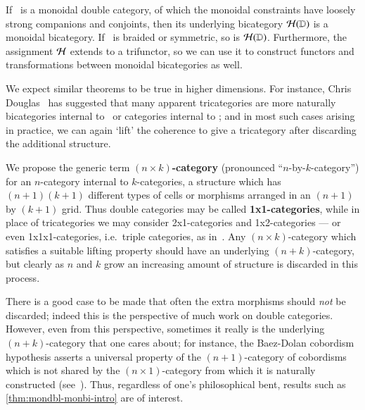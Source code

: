 \begin{thm}\label{thm:mondbl-monbi-intro}
  If \lD\ is a monoidal double category, of which the monoidal constraints have loosely strong companions and conjoints, then its underlying bicategory $\mathcal{H}(\mathbb{D})$ is a monoidal bicategory.  If \lD\ is braided
  or symmetric, so is $\mathcal{H}(\mathbb{D})$. Furthermore, the assignment $\mathcal{H}$
  extends to a trifunctor, so we can use it to construct functors and
  transformations between monoidal bicategories as well.
\end{thm}

We expect similar theorems to be true in higher dimensions.  For
instance, Chris Douglas~\cite{douglas:tfttalk} has suggested that many
apparent tricategories are more naturally bicategories internal to
\cCat\ or categories internal to \cTwocat; and in most such cases
arising in practice, we can again `lift' the coherence to give a
tricategory after discarding the additional structure.

We propose the generic term \textbf{$(n\times k)$-category}
(pronounced ``$n$-by-$k$-category'') for an $n$-category internal to
$k$-categories, a structure which has $(n+1)(k+1)$ different types of
cells or morphisms arranged in an $(n+1)$ by $(k+1)$ grid.  Thus
double categories may be called \textbf{1x1-categories}, while in
place of tricategories we may consider 2x1-categories and
1x2-categories --- or even 1x1x1-categories, i.e.\ triple categories,
as in~\cite{gp:intercategories-i,gp:intercategories-ii}.  Any
$(n\times k)$-category which satisfies a suitable lifting property
should have an underlying $(n+k)$-category, but clearly as $n$ and $k$
grow an increasing amount of structure is discarded in this process.


There is a good case to be made that often the extra morphisms should
\emph{not} be discarded; indeed this is the perspective of much work
on double categories.  However, even from this perspective, sometimes
it really is the underlying $(n+k)$-category that one cares about; for
instance, the Baez-Dolan cobordism hypothesis asserts a universal
property of the $(n+1)$-category of cobordisms which is not shared by
the $(n\times 1)$-category from which it is naturally constructed
(see~\cite{lurie:tft}).  Thus, regardless of one's philosophical bent,
results such as \autoref{thm:mondbl-monbi-intro} are of interest.

